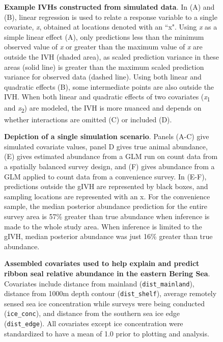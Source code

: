 \documentclass[10pt,letterpaper]{article}
\begin{document}

\begin{figure}[!h]
\caption{{\bf Example IVHs constructed from simulated data}.  In (A) and (B), linear regression is used to relate a response variable to a single covariate, \textit{x}, obtained at locations denoted with an ``x".  Using \textit{x} as a simple linear effect (A), only predictions less than the minimum observed value of \textit{x} or greater than the maximum value of \textit{x} are outside the IVH (shaded area), as scaled prediction variance in these areas (solid line) is greater than the maximum scaled prediction variance for observed data (dashed line).  Using both linear and quadratic effects (B), some intermediate points are also outside the IVH.  When both linear and quadratic effects of two covariates (\textit{x}\textsubscript{1} and \textit{x}\textsubscript{2}) are modeled, the IVH is more nuanced and depends on whether interactions are omitted (C) or included (D). }
\label{fig:IVH}
\end{figure}

\begin{figure}[!h]
\caption{{\bf Depiction of a single simulation scenario}.  Panels (A-C) give simulated covariate values, panel D gives true animal abundance, (E) gives estimated abundance from a GLM run on count data from a spatially balanced survey design, and (F) gives abundance from a GLM applied to count data from a convenience survey.  In (E-F), predictions outside the gIVH are represented by black boxes, and sampling locations are represented with an x.  For the convenience sample, the median posterior abundance prediction for the entire survey area is 57\% greater than true abundance when inference is made to the whole study area.  When inference is limited to the gIVH, median posterior abundance was just 16\% greater than true abundance.}
\label{fig:sim_maps}
\end{figure}

\begin{figure}[!h]
\caption{{\bf Assembled covariates used to help explain and predict ribbon seal relative abundance in the eastern Bering Sea}.  Covariates include distance from mainland (\texttt{dist\_mainland}), distance from 1000m depth contour (\texttt{dist\_shelf}), average remotely sensed sea ice concentration while surveys were being conducted (\texttt{ice\_conc}), and distance from the southern sea ice edge (\texttt{dist\_edge}).  All covariates except ice concentration were standardized to have a mean of 1.0 prior to plotting and analysis.
}
\label{fig:covs}
\end{figure}
\end{document}

